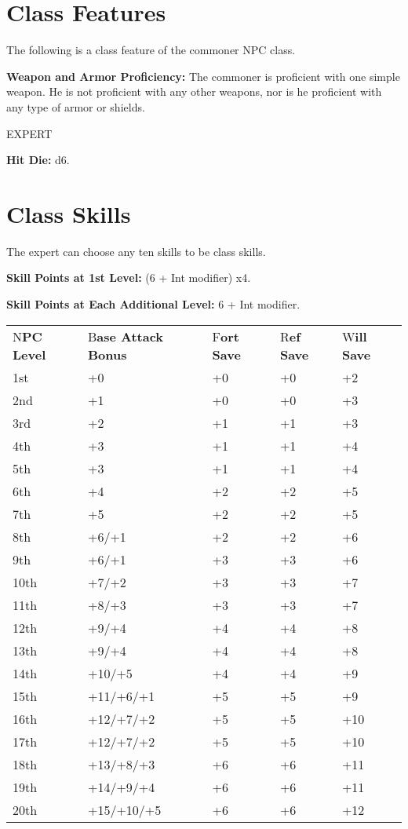 \documentclass{article}
\begin{document}
{\vspace{12pt}
\section*{\textbf{Class Features}}

The following is a class feature of the commoner NPC class.

\textbf{Weapon and Armor Proficiency:} The commoner is proficient with one simple 
weapon. He is not proficient with any other weapons, nor is he proficient with 
any type of armor or shields.

\vspace{12pt}
EXPERT

\textbf{Hit Die:} d6.

\section*{\textbf{Class Skills}}

The expert can choose any ten skills to be class skills.

\textbf{Skill Points at 1st Level:} (6 + Int modifier) x4.

\textbf{Skill Points at Each Additional Level:} 6 + Int modifier.

\vspace{12pt}
\begin{tabular}{|>{\raggedright}p{49pt}|>{\raggedright}p{55pt}|>{\raggedright}p{23pt}|>{\raggedright}p{23pt}|>{\raggedright}p{23pt}|}
\hline
\multicolumn{5}{|p{175pt}|}{\section*{T\textbf{able: The Expert}}}\tabularnewline
\hline
N\textbf{PC Level} & B\textbf{ase Attack}\linebreak{}
\textbf{Bonus} & F\textbf{ort}\linebreak{}
\textbf{Save} & R\textbf{ef}\linebreak{}
\textbf{Save} & W\textbf{ill}\linebreak{}
\textbf{Save}\tabularnewline
\hline
1st & +0 & +0 & +0 & +2\tabularnewline
\hline
2nd & +1 & +0 & +0 & +3\tabularnewline
\hline
3rd & +2 & +1 & +1 & +3\tabularnewline
\hline
4th & +3 & +1 & +1 & +4\tabularnewline
\hline
5th & +3 & +1 & +1 & +4\tabularnewline
\hline
6th & +4 & +2 & +2 & +5\tabularnewline
\hline
7th & +5 & +2 & +2 & +5\tabularnewline
\hline
8th & +6/+1 & +2 & +2 & +6\tabularnewline
\hline
9th & +6/+1 & +3 & +3 & +6\tabularnewline
\hline
10th & +7/+2 & +3 & +3 & +7\tabularnewline
\hline
11th & +8/+3 & +3 & +3 & +7\tabularnewline
\hline
12th & +9/+4 & +4 & +4 & +8\tabularnewline
\hline
13th & +9/+4 & +4 & +4 & +8\tabularnewline
\hline
14th & +10/+5 & +4 & +4 & +9\tabularnewline
\hline
15th & +11/+6/+1 & +5 & +5 & +9\tabularnewline
\hline
16th & +12/+7/+2 & +5 & +5 & +10\tabularnewline
\hline
17th & +12/+7/+2 & +5 & +5 & +10\tabularnewline
\hline
18th & +13/+8/+3 & +6 & +6 & +11\tabularnewline
\hline
19th & +14/+9/+4 & +6 & +6 & +11\tabularnewline
\hline
20th & +15/+10/+5 & +6 & +6 & +12\tabularnewline
\hline
\end{tabular}

}
\end{document}
